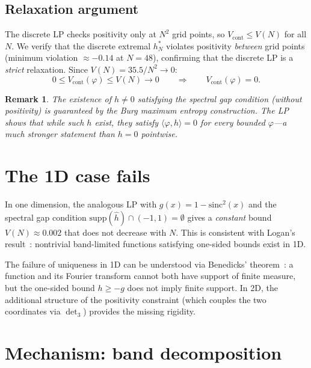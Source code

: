 \documentclass[11pt]{article}
\newtheorem{remark}[theorem]{Remark}
\begin{document}
\subsection{Relaxation argument}

The discrete LP checks positivity only at $N^2$ grid points, so
$V_{\mathrm{cont}} \leq V(N)$ for all $N$. We verify that the
discrete extremal $h^*_N$ violates positivity \emph{between} grid
points (minimum violation $\approx -0.14$ at $N = 48$), confirming
that the discrete LP is a \emph{strict} relaxation. Since
$V(N) = 35.5/N^2 \to 0$:
\begin{equation}
0 \leq V_{\mathrm{cont}}(\varphi) \leq V(N) \to 0
\qquad \Longrightarrow \qquad V_{\mathrm{cont}}(\varphi) = 0.
\end{equation}

\begin{remark}
The existence of $h \neq 0$ satisfying the spectral gap condition
(without positivity) is guaranteed by the Burg maximum entropy
construction. The LP shows that while such $h$ exist, they satisfy
$\langle \varphi, h \rangle = 0$ for every bounded $\varphi$---a
much stronger statement than $h = 0$ pointwise.
\end{remark}


\section{The 1D case fails}

In one dimension, the analogous LP with $g(x) = 1 - \mathrm{sinc}^2(x)$
and the spectral gap condition $\mathrm{supp}(\hat{h}) \cap (-1, 1) = \emptyset$
gives a \emph{constant} bound $V(N) \approx 0.002$ that does not
decrease with $N$. This is consistent with Logan's result~\cite{Logan1983}:
nontrivial band-limited functions satisfying one-sided bounds exist in 1D.

The failure of uniqueness in 1D can be understood via Benedicks'
theorem~\cite{Benedicks1985}: a function and its Fourier transform
cannot both have support of finite measure, but the one-sided bound
$h \geq -g$ does not imply finite support. In 2D, the additional
structure of the positivity constraint (which couples the two
coordinates via $\det_3$) provides the missing rigidity.


\section{Mechanism: band decomposition}
\end{document}
